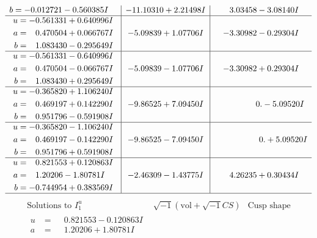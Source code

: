\documentclass[1p]{elsarticle_modified}
\theoremstyle{definition}
\newcommand{\I}{\sqrt{-1}}
\begin{document}
$$\begin{array}{c|c|c}
\begin{aligned}
b &= -0.012721 - 0.560385 I\end{aligned}
 & -11.10310 + 2.21498 I & \phantom{-}3.03458 - 3.08140 I \\ \hline\begin{aligned}
u &= -0.561331 + 0.640996 I \\
a &= \phantom{-}0.470504 + 0.066767 I \\
b &= \phantom{-}1.083430 - 0.295649 I\end{aligned}
 & -5.09839 + 1.07706 I & -3.30982 - 0.29304 I \\ \hline\begin{aligned}
u &= -0.561331 - 0.640996 I \\
a &= \phantom{-}0.470504 - 0.066767 I \\
b &= \phantom{-}1.083430 + 0.295649 I\end{aligned}
 & -5.09839 - 1.07706 I & -3.30982 + 0.29304 I \\ \hline\begin{aligned}
u &= -0.365820 + 1.106240 I \\
a &= \phantom{-}0.469197 + 0.142290 I \\
b &= \phantom{-}0.951796 - 0.591908 I\end{aligned}
 & -9.86525 + 7.09450 I & \phantom{-0.000000 } 0. - 5.09520 I \\ \hline\begin{aligned}
u &= -0.365820 - 1.106240 I \\
a &= \phantom{-}0.469197 - 0.142290 I \\
b &= \phantom{-}0.951796 + 0.591908 I\end{aligned}
 & -9.86525 - 7.09450 I & \phantom{-0.000000 -}0. + 5.09520 I \\ \hline\begin{aligned}
u &= \phantom{-}0.821553 + 0.120863 I \\
a &= \phantom{-}1.20206 - 1.80781 I \\
b &= -0.744954 + 0.383569 I\end{aligned}
 & -2.46309 - 1.43775 I & \phantom{-}4.26235 + 0.30434 I\\
 \hline 
 \end{array}$$\newpage$$\begin{array}{c|c|c}  
\text{Solutions to }I^u_{1}& \I (\text{vol} + \sqrt{-1}CS) & \text{Cusp shape}\\
 \hline 
\begin{aligned}
u &= \phantom{-}0.821553 - 0.120863 I \\
a &= \phantom{-}1.20206 + 1.80781 I \\

\end{aligned}
\end{array}$$
\end{document}
